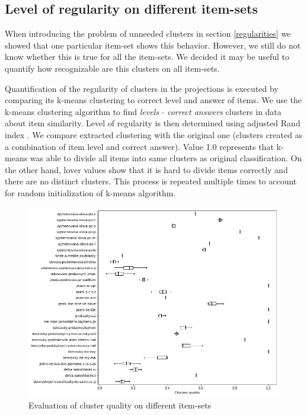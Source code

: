 \documentclass[
  digital, %
  table,   %
  nolof,     %
  nolot,     %
  nocover,
  color,
  final, %
]{fithesis3}
\begin{document}

\subsection{Level of regularity on different item-sets}\label{level-of-regularity-on-different-item-sets}

When introducing the problem of unneeded clusters in section \ref{regularities} we showed that one particular item-set shows this behavior. However, we still do not know whether this is true for all the item-sets. We decided it may be useful to quantify how recognizable are this clusters on all item-sets.


Quantification of the regularity of clusters in the projections is executed by comparing its k-means clustering to correct level and answer of items. We use the k-means clustering algorithm \cite{hartigan1979algorithm} to find \textit{levels $\cdot$ correct answers} clusters in data about item similarity. Level of regularity is then determined using adjusted Rand index \cite{santos2009use}. We compare extracted clustering with the original one (clusters created as a combination of item level and correct answer). Value 1.0 represents that k-means was able to divide all items into same clusters as original classification. On the other hand, lover values show that it is hard to divide items correctly and there are no distinct clusters. This process is repeated multiple times to account for random initialization of k-means algorithm.

\begin{figure}
  \includegraphics[width=\textwidth]{img/clustering_quality}
  \caption{Evaluation of cluster quality on different item-sets}
  \label{fig:clustering_quality}
\end{figure}
\end{document}
